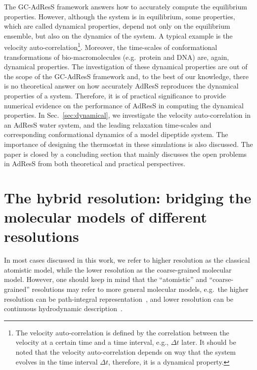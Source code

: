 \documentclass[epjST]{svjour}
\newcommand{\recheck}[1]{{\color{red} #1}}
\begin{document}
The GC-AdResS framework answers how to accurately compute the  equilibrium properties.
However, although the system is in equilibrium,
some properties, which are called dynamical properties,
\recheck{depend not only on the equilibrium ensemble, but also on the dynamics of the system.}
A typical example is the velocity auto-correlation\footnote{
  \recheck{
  The velocity auto-correlation
  is defined by the correlation between the velocity at a certain time and a time interval, e.g., $\Delta t$ later.
  It should be noted that
  the velocity auto-correlation depends on way that the system evolves in the time interval $\Delta t$,
  therefore, it is a dynamical property. }}.
Moreover, the time-scales of conformational transformations
of bio-macromolecules (e.g.~protein and DNA)
are, again, dynamical properties.
The investigation of these  dynamical properties are out of the scope of the GC-AdResS framework and,
to the best of our knowledge, there is no theoretical answer on how accurately  AdResS reproduces the 
dynamical properties of a system.
Therefore, it is of practical significance to  provide numerical
evidence on the performance of AdResS in computing the dynamical properties.
In Sec.~\ref{sec:dynamical}, we investigate the
velocity auto-correlation in an AdResS water system, and the
leading relaxation time-scales and corresponding conformational dynamics of
a model dipeptide system.
The importance of designing the thermostat in these simulations
is also discussed.
The paper is closed by a concluding section
that mainly discusses the open problems in AdResS from both theoretical
and practical perspectives.

\section{The hybrid resolution: bridging the molecular models of different resolutions}
\label{sec:design}

In most cases discussed in this work, we refer to higher resolution as the classical atomistic model, while
the lower resolution as the coarse-grained molecular model. However,
one should keep in mind that the ``atomistic'' and ``coarse-grained'' resolutions
may refer to more general molecular models, e.g.~the higher resolution can be
path-integral representation~\cite{poma2010classical}, and lower resolution can be continuous
hydrodynamic description~\cite{delgado2009coupling}.
\end{document}
